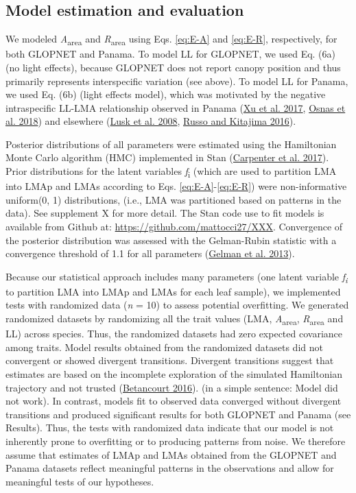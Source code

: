 \documentclass[
  12pt,
  a4paper,
,tablecaptionabove
]{scrartcl}
\begin{document}
\hypertarget{model-estimation-and-evaluation}{%
\subsection{Model estimation and evaluation}\label{model-estimation-and-evaluation}}

We modeled \emph{A}\textsubscript{area} and \emph{R}\textsubscript{area} using Eqs. \eqref{eq:E-A} and \eqref{eq:E-R}, respectively, for both GLOPNET and Panama.
To model LL for GLOPNET, we used Eq. (6a) (no light effects), because GLOPNET does not report canopy position and thus primarily represents interspecific variation (see above).
To model LL for Panama, we used Eq. (6b) (light effects model), which was motivated by the negative intraspecific LL-LMA relationship observed in Panama (\protect\hyperlink{ref-Xu2017}{Xu et al. 2017}, \protect\hyperlink{ref-Osnas2018}{Osnas et al. 2018}) and elsewhere (\protect\hyperlink{ref-Lusk2008}{Lusk et al. 2008}, \protect\hyperlink{ref-Russo2016}{Russo and Kitajima 2016}).

Posterior distributions of all parameters were estimated using the Hamiltonian Monte Carlo algorithm (HMC) implemented in Stan (\protect\hyperlink{ref-Carpenter2017}{Carpenter et al. 2017}).
Prior distributions for the latent variables \emph{f}\textsubscript{i} (which are used to partition LMA into LMAp and LMAs according to Eqs. \eqref{eq:E-A}-\eqref{eq:E-R}) were non-informative uniform(0, 1) distributions, (i.e., LMA was partitioned based on patterns in the data).
See supplement X for more detail.
The Stan code use to fit models is available from Github at: \href{https://github.com/mattocci27/LMApLMAs}{https://github.com/mattocci27/XXX}.
Convergence of the posterior distribution was assessed with the Gelman-Rubin statistic with a convergence threshold of 1.1 for all parameters (\protect\hyperlink{ref-Gelman2013}{Gelman et al. 2013}).

Because our statistical approach includes many parameters (one latent variable \emph{f\textsubscript{i}} to partition LMA into LMAp and LMAs for each leaf sample), we implemented tests with randomized data (\emph{n} = 10) to assess potential overfitting.
We generated randomized datasets by randomizing all the trait values (LMA, \emph{A}\textsubscript{area}, \emph{R}\textsubscript{area} and LL) across species.
Thus, the randomized datasets had zero expected covariance among traits.
Model results obtained from the randomized datasets did not convergent or showed divergent transitions.
Divergent transitions suggest that estimates are based on the incomplete exploration of the simulated Hamiltonian trajectory and not trusted (\protect\hyperlink{ref-Betancourt2016}{Betancourt 2016}).
(in a simple sentence: Model did not work).
In contrast, models fit to observed data converged without divergent transitions and produced significant results for both GLOPNET and Panama (see Results).
Thus, the tests with randomized data indicate that our model is not inherently prone to overfitting or to producing patterns from noise.
We therefore assume that estimates of LMAp and LMAs obtained from the GLOPNET and Panama datasets reflect meaningful patterns in the observations and allow for meaningful tests of our hypotheses.
\end{document}
